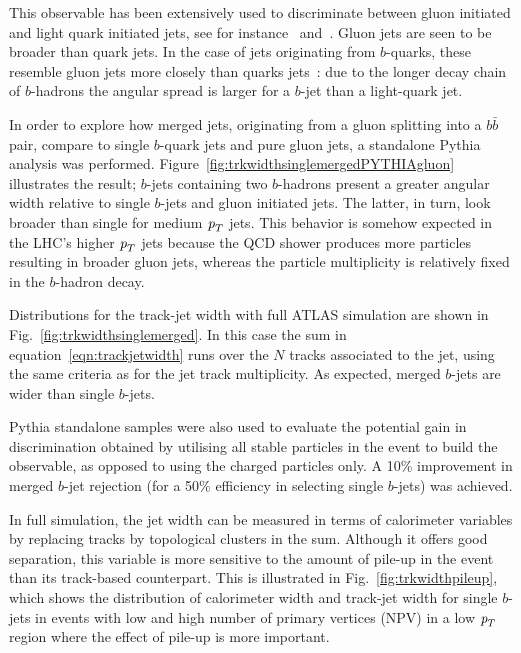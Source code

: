 This observable has been extensively used to discriminate between gluon initiated and light quark initiated jets, see for instance~\cite{PhysRevLett.107.172001} and~\cite{ATLAS-CONF-2011-053}. Gluon jets are seen to be broader than quark jets. In the case of jets originating from $b$-quarks, these resemble gluon jets more closely than quarks jets~\cite{Buskulic1996353}: due to the longer decay chain of $b$-hadrons the angular spread is larger for a $b$-jet than a light-quark jet. 

In order to explore how merged jets, originating from a gluon splitting into a $b\bar{b}$ pair, compare to single $b$-quark jets and pure gluon jets,  a standalone {\sc Pythia} analysis was performed.  Figure~\ref{fig:trkwidthsinglemergedPYTHIAgluon} illustrates the result; $b$-jets containing two $b$-hadrons present a greater angular width relative to single $b$-jets and gluon initiated jets. The latter, in turn, look broader than single for medium ${\emph{p}_{T}}$ jets. This behavior is somehow expected in the LHC's higher ${\emph{p}_{T}}$ jets because the QCD shower produces more particles resulting in broader gluon jets,  whereas the particle multiplicity is relatively fixed in the $b$-hadron decay.

Distributions for the track-jet width with full ATLAS simulation are shown in Fig.~\ref{fig:trkwidthsinglemerged}. In this case %
the sum in equation~\ref{eqn:trackjetwidth} runs over the $N$ tracks associated to the jet, using the same criteria as for the jet track multiplicity. As expected, merged $b$-jets are wider than single $b$-jets. 

{\sc Pythia} standalone samples were also used to evaluate the potential gain in discrimination obtained by utilising all stable particles in the event to build the observable, as opposed to using the charged particles only.  A 10\% %
 improvement in merged $b$-jet rejection (for a 50\% efficiency in selecting single $b$-jets) was achieved.

In full simulation, the jet width can be measured in terms of calorimeter variables by replacing tracks by topological clusters in the sum.  Although it offers good separation, this variable is more sensitive to the amount of pile-up in the event than its track-based counterpart. This is illustrated in Fig.~\ref{fig:trkwidthpileup}, which shows the distribution of calorimeter width and track-jet width for single $b$-jets in events with low and high number of primary vertices (NPV) in a low ${\emph{p}_{T}}$ region where the effect of pile-up is more important. 


